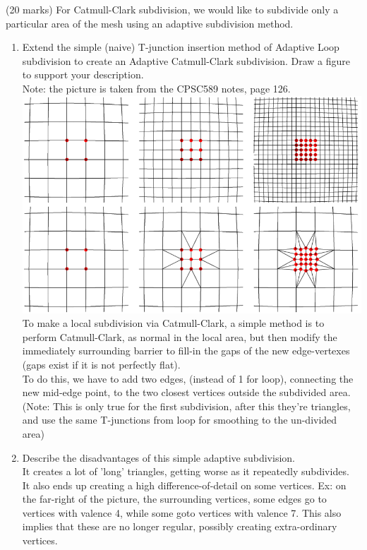 (20 marks) For Catmull-Clark subdivision, we would like to subdivide only a particular area
of the mesh using an adaptive subdivision method.
\begin{enumerate}
\item Extend the simple (naive) T-junction insertion method of Adaptive Loop subdivision to create an Adaptive Catmull-Clark subdivision. Draw a figure to support your description. \\
Note: the picture is taken from the CPSC589 notes, page 126. \\
\includegraphics[width=400bp]{q6_pic.png} \\
To make a local subdivision via Catmull-Clark, a simple method is to perform Catmull-Clark, as normal in the local area, but then modify the immediately surrounding barrier to fill-in the gaps of the new edge-vertexes (gaps exist if it is not perfectly flat). \\
To do this, we have to add two edges, (instead of 1 for loop), connecting the new mid-edge point, to the two closest vertices outside the subdivided area. \\
(Note: This is only true for the first subdivision, after this they're triangles, and use the same T-junctions from loop for smoothing to the un-divided area)\\

\item Describe the disadvantages of this simple adaptive subdivision. \\
It creates a lot of 'long' triangles, getting worse as it repeatedly subdivides. \\
It also ends up creating a high difference-of-detail on some vertices. Ex: on the far-right of the picture, the surrounding vertices, some edges go to vertices with valence 4, while some goto vertices with valence 7. This also implies that these are no longer regular, possibly creating extra-ordinary vertices. \\

\end{enumerate}
